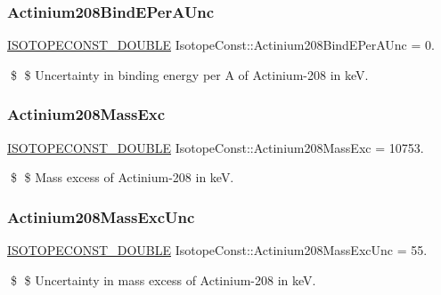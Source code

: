 \subsubsection{\texorpdfstring{Actinium208\+Bind\+E\+Per\+A\+Unc}{Actinium208BindEPerAUnc}}
{\footnotesize\ttfamily \mbox{\hyperlink{group___isotope_const-_macros_ga8f45a7272ce02c0b4c65c44636ed719a}{I\+S\+O\+T\+O\+P\+E\+C\+O\+N\+S\+T\+\_\+\+D\+O\+U\+B\+LE}} Isotope\+Const\+::\+Actinium208\+Bind\+E\+Per\+A\+Unc = 0.}

\$ \$ Uncertainty in binding energy per A of Actinium-\/208 in keV. \mbox{\label{group___isotope_const-_actinium-_ac208_ga9c46e463ec2c504fb6235562fb959ed7}} 
\subsubsection{\texorpdfstring{Actinium208\+Mass\+Exc}{Actinium208MassExc}}
{\footnotesize\ttfamily \mbox{\hyperlink{group___isotope_const-_macros_ga8f45a7272ce02c0b4c65c44636ed719a}{I\+S\+O\+T\+O\+P\+E\+C\+O\+N\+S\+T\+\_\+\+D\+O\+U\+B\+LE}} Isotope\+Const\+::\+Actinium208\+Mass\+Exc = 10753.}

\$ \$ Mass excess of Actinium-\/208 in keV. \mbox{\label{group___isotope_const-_actinium-_ac208_ga91413e6b0e483e661a2bcef05205de78}} 
\subsubsection{\texorpdfstring{Actinium208\+Mass\+Exc\+Unc}{Actinium208MassExcUnc}}
{\footnotesize\ttfamily \mbox{\hyperlink{group___isotope_const-_macros_ga8f45a7272ce02c0b4c65c44636ed719a}{I\+S\+O\+T\+O\+P\+E\+C\+O\+N\+S\+T\+\_\+\+D\+O\+U\+B\+LE}} Isotope\+Const\+::\+Actinium208\+Mass\+Exc\+Unc = 55.}

\$ \$ Uncertainty in mass excess of Actinium-\/208 in keV. \mbox{\label{group___isotope_const-_actinium-_ac208_ga36ac7574eb1ea1a1eac5da5240419293}} 
